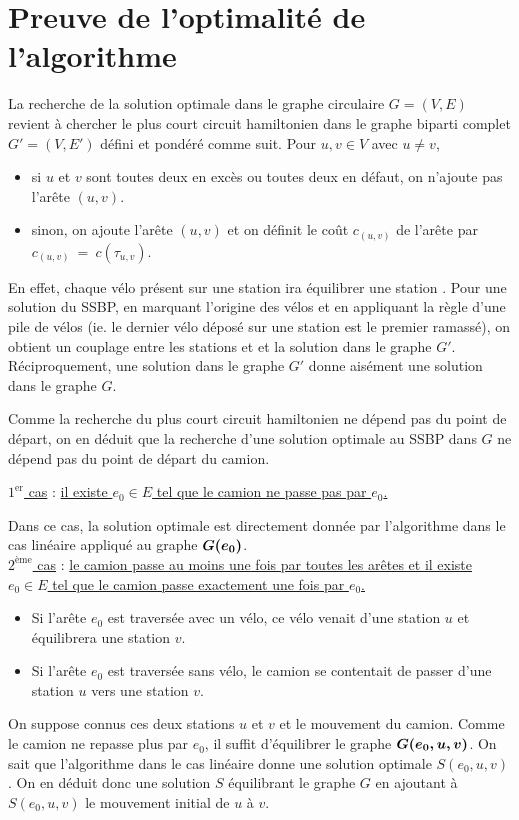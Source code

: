 \section{Preuve de l'optimalité de l'algorithme}
\label{Capicité unitaire preuve}

La recherche de la solution optimale dans le graphe circulaire $G=(V,E)$ revient à chercher le plus court circuit hamiltonien dans le graphe biparti complet $G'=(V,E')$ défini et pondéré comme suit. Pour $u,v \in V$ avec $u \ne v$,
\begin{itemize}
\item si $u$ et $v$ sont toutes deux en excès ou toutes deux en défaut, on n'ajoute pas l'arête $(u,v)$.
\item sinon, on ajoute l'arête $(u,v)$ et on définit le coût $c_{(u,v)}$ de l'arête par $c_{(u,v)}~=~c(\tau_{u,v})$.
\end{itemize}
En effet, chaque vélo présent sur une station \plus ira équilibrer une station \moins. Pour une solution du SSBP, en marquant l'origine des vélos et en appliquant la règle d'une pile de vélos (ie. le dernier vélo déposé sur une station est le premier ramassé), on obtient un couplage entre les stations \plus et \moins et la solution dans le graphe $G'$. Réciproquement, une solution dans le graphe $G'$ donne aisément une solution dans le graphe $G$.

Comme la recherche du plus court circuit hamiltonien ne dépend pas du point de départ, on en déduit que la recherche d'une solution optimale au SSBP dans $G$ ne dépend pas du point de départ du camion.

\uline{$1^{\mbox{er}}$ cas} : \uline{il existe $e_0 \in E$ tel que le camion ne passe pas par $e_0$.}

Dans ce cas, la solution optimale est directement donnée par l'algorithme dans le cas linéaire appliqué au graphe $\boldsymbol{G(e_0)}$.
\\

\uline{$2^{\mbox{ème}}$ cas} : \uline{le camion passe au moins une fois par toutes les arêtes et il existe $e_0 \in E$ tel que le camion passe exactement une fois par $e_0$.}

\begin{itemize}
\item Si l'arête $e_0$ est traversée avec un vélo, ce vélo venait d'une station \plus $u$ et équilibrera une station \moins $v$.
\item Si l'arête $e_0$ est traversée sans vélo, le camion se contentait de passer d'une station \moins $u$ vers une station \plus $v$.
\end{itemize}
On suppose connus ces deux stations $u$ et $v$ et le mouvement du camion. Comme le camion ne repasse plus par $e_0$, il suffit d'équilibrer le graphe $\boldsymbol{G(e_0,u,v)}$. On sait que l'algorithme dans le cas linéaire donne une solution optimale $S(e_0,u,v)$. On en déduit donc une solution $S$ équilibrant le graphe $G$ en ajoutant à $S(e_0,u,v)$ le mouvement initial de $u$ à $v$.
\\

